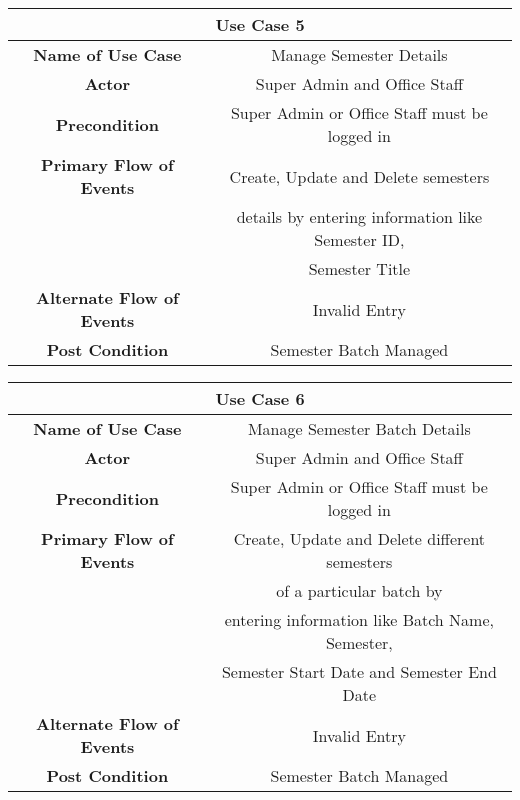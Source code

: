 \vspace{1cm}
\begin{center}
    \begin{tabular}{|c|c|}
        \hline
        \multicolumn{2}{|c|}{Use Case 5} \\
        \hline
        \textbf{Name of Use Case} & Manage Semester Details \\
        \hline
        \textbf{Actor} & Super Admin and Office Staff \\
        \hline
        \textbf{Precondition} & Super Admin or Office Staff must be logged in \\
        \hline
        \textbf{Primary Flow of Events} & Create, Update and Delete semesters \\
        & details by entering information like Semester ID, \\
        & Semester Title \\
        \hline
        \textbf{Alternate Flow of Events} & Invalid Entry \\
        \hline
        \textbf{Post Condition} & Semester Batch Managed \\
        \hline
    \end{tabular}
\end{center}

\vspace{1cm}
\begin{center}
    \begin{tabular}{|c|c|}
        \hline
        \multicolumn{2}{|c|}{Use Case 6} \\
        \hline
        \textbf{Name of Use Case} & Manage Semester Batch Details \\
        \hline
        \textbf{Actor} & Super Admin and Office Staff \\
        \hline
        \textbf{Precondition} & Super Admin or Office Staff must be logged in \\
        \hline
        \textbf{Primary Flow of Events} & Create, Update and Delete different semesters \\
        & of a particular batch by \\
        & entering information like Batch Name, Semester, \\
        & Semester Start Date and Semester End Date \\
        \hline
        \textbf{Alternate Flow of Events} & Invalid Entry \\
        \hline
        \textbf{Post Condition} & Semester Batch Managed \\
        \hline
    \end{tabular}
\end{center}

